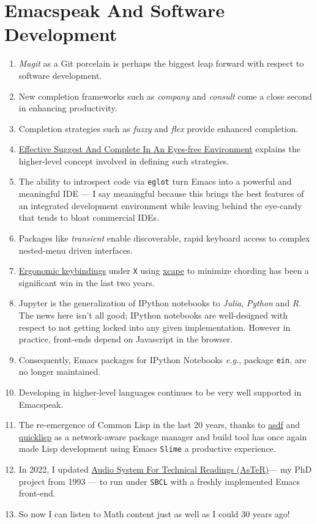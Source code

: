 \documentclass[11pt]{article}
\begin{document}
\section{Emacspeak And Software Development}
\label{sec:orgd73a8b6}

\begin{enumerate}
\item \emph{Magit}  as a Git porcelain is perhaps the biggest leap forward
with respect to software development.
\item New completion frameworks such as \emph{company} and \emph{consult} come a
close second in enhancing productivity.
\item Completion strategies such as  \emph{fuzzy} and
\emph{flex} provide  enhanced completion.
\item \href{https://emacspeak.blogspot.com/2018/06/effective-suggest-and-complete-in-eyes.html}{Effective Suggest And Complete In An Eyes-free Environment}
explains the higher-level concept  involved in defining such strategies.

\item The ability to introspect code via  \texttt{eglot} 
 turn Emacs into a powerful and meaningful IDE ---  I say
meaningful because this brings the best features of an integrated
development environment while leaving behind the eye-candy that
tends to bloat commercial IDEs.
\item Packages like \emph{transient}  enable discoverable, rapid keyboard access to
complex nested-menu driven interfaces.
\item \href{https://emacspeak.blogspot.com/2023/09/emacs-ergonomics-dont-punish-your.html}{Ergonomic keybindings} under \texttt{X} using \href{https://github.com/alols/xcape}{xcape} to minimize
chording has been  a significant win in the last two years.
\item Jupyter is the   generalization of IPython notebooks to \emph{Julia}, \emph{Python}
and \emph{R}. The news here isn't all good; IPython notebooks are
well-designed with respect to not getting locked into any given
implementation. However in practice,  front-ends
depend on Javascript in the  browser.
\item Consequently,  Emacs  packages  for IPython
Notebooks \emph{e.g.}, package \texttt{ein},  are no longer maintained.
\item Developing in higher-level languages continues to be very well
supported in Emacspeak.
\item The re-emergence of Common Lisp in the last 20 years, thanks to
\href{https://asdf.common-lisp.dev/asdf.html}{asdf} and \href{https://www.quicklisp.org/}{quicklisp} as a network-aware package manager and build
tool has once again made Lisp development using Emacs \texttt{Slime} a
productive experience.
\item In 2022, I updated \href{https://emacspeak.blogspot.com/2022/12/aster-spoken-math-on-emacspeak-audio\_21.html}{Audio System For Technical
Readings (AsTeR)}--- my PhD project from 1993 --- to run under \texttt{SBCL}
with a freshly implemented Emacs front-end.
\item So now I can listen to Math content just as well as I could 30
years ago!
\end{enumerate}
\end{document}
